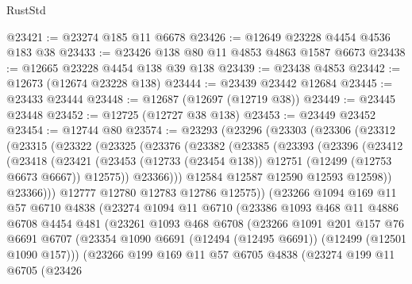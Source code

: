 \begin{lexlean}{RustStd}
\begin{coremodule}
{\begin{coremodule}
{{{{{{{{{{{{{{{{{{{{{{{{{{{{{{{{{{{{{{{{{{{{{{{{{{{{{{{{{{{{{{{{{{{{{{{{{{{{{{{{@23421 := @23274 @185 @11 @6678
@23426 := @12649 @23228 @4454 @4536 @183 @38
@23433 := @23426 @138 @80 @11 @4853 @4863 @1587 @6673
@23438 := @12665 @23228 @4454 @138 @39 @138
@23439 := @23438 @4853
@23442 := @12673 (@12674 @23228 @138)
@23444 := @23439 @23442 @12684
@23445 := @23433 @23444
@23448 := @12687 (@12697 (@12719 @38))
@23449 := @23445 @23448
@23452 := @12725 (@12727 @38 @138)
@23453 := @23449 @23452
@23454 := @12744 @80
@23574 := @23293
    (@23296
      (@23303
        (@23306
          (@23312
            (@23315
              (@23322
                (@23325
                  (@23376
                    (@23382
                      (@23385
                        (@23393
                          (@23396
                            (@23412
                              (@23418
                                (@23421
                                  (@23453
                                    (@12733 (@23454 @138))
                                    @12751
                                    (@12499 (@12753 @6673 @6667))
                                    @12575))
                                @23366)))
                          @12584
                          @12587
                          @12590
                          @12593
                          @12598))
                      @23366)))
                @12777
                @12780
                @12783
                @12786
                @12575))
            (@23266
              @1094
              @169
              @11
              @57
              @6710
              @4838
              (@23274
                @1094
                @11
                @6710
                (@23386
                  @1093
                  @468
                  @11
                  @4886
                  @6708
                  @4454
                  @481
                  (@23261
                    @1093
                    @468
                    @6708
                    (@23266
                      @1091
                      @201
                      @157
                      @76
                      @6691
                      @6707
                      (@23354 @1090 @6691 (@12494 (@12495 @6691)) (@12499 (@12501 @1090 @157)))
                      (@23266
                        @199
                        @169
                        @11
                        @57
                        @6705
                        @4838
                        (@23274
                          @199
                          @11
                          @6705
                          (@23426
}}}}}}}}}}}}}}}}}}}}}}}}}}}}}}}}}}}}}}}}}}}}}}}}}}}}}}}}}}}}}}}}}}}}}}}}}}}}}}}}
\end{coremodule}}
\end{coremodule}
\end{lexlean}
